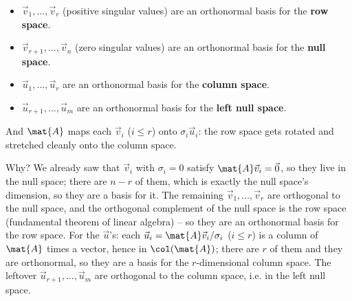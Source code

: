\begin{focusbox}
\begin{itemize}
  \item $\vec{v}_1,\dots,\vec{v}_r$ (positive singular values) are an orthonormal
        basis for the \textbf{row space}.
  \item $\vec{v}_{r+1},\dots,\vec{v}_n$ (zero singular values) are an orthonormal
        basis for the \textbf{null space}.
  \item $\vec{u}_1,\dots,\vec{u}_r$ are an orthonormal basis for the
        \textbf{column space}.
  \item $\vec{u}_{r+1},\dots,\vec{u}_m$ are an orthonormal basis for the
        \textbf{left null space}.
\end{itemize}
And $\mat{A}$ maps each $\vec{v}_i$ ($i\le r$) onto $\sigma_i \vec{u}_i$: the row
space gets rotated and stretched cleanly onto the column space.
\end{focusbox}

Why? We already saw that $\vec{v}_i$ with $\sigma_i = 0$ satisfy $\mat{A}\vec{v}_i
= \vec{0}$, so they live in the null space; there are $n - r$ of them, which is
exactly the null space's dimension, so they are a basis for it. The remaining
$\vec{v}_1,\dots,\vec{v}_r$ are orthogonal to the null space, and the orthogonal
complement of the null space is the row space (fundamental theorem of linear
algebra) -- so they are an orthonormal basis for the row space. For the
$\vec{u}$'s: each $\vec{u}_i = \mat{A}\vec{v}_i/\sigma_i$ ($i\le r$) is a column of
$\mat{A}$ times a vector, hence in $\col(\mat{A})$; there are $r$ of them and they
are orthonormal, so they are a basis for the $r$-dimensional column space. The
leftover $\vec{u}_{r+1},\dots,\vec{u}_m$ are orthogonal to the column space, i.e.
in the left null space.

